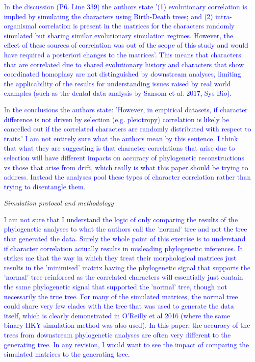\documentclass[12pt,letterpaper]{article}
\renewcommand{\subsection}[1]{%
\bigskip
\begin{center}
\begin{large}
\normalfont\itshape #1
\end{large}
\end{center}}
\begin{document}
\textcolor{blue}{In the discussion (P6. Line 339) the authors state '(1) evolutionary correlation is implied by simulating the characters using Birth-Death trees; and (2) intra-organismal correlation is present in the matrices for the characters randomly simulated but sharing similar evolutionary simulation regimes.  However, the effect of these sources of correlation was out of the scope of this study and would have required a posteriori changes to the matrices'. This means that characters that are correlated due to shared evolutionary history and characters that show coordinated homoplasy are not distinguished by downstream analyses, limiting the applicability of the results for understanding issues raised by real world examples (such as the dental data analysis by Sansom et al. 2017, Sys Bio).}

\textcolor{blue}{In the conclusions the authors state: 'However, in empirical datasets, if character difference is not driven by selection (e.g. pleiotropy) correlation is likely be cancelled out if the correlated characters are randomly distributed with respect to traits.' I am not entirely sure what the authors mean by this sentence. I think that what they are suggesting is that character correlations that arise due to selection will have different impacts on accuracy of phylogenetic reconstructions vs those that arise from drift, which really is what this paper should be trying to address. Instead the analyses pool these types of character correlation rather than trying to disentangle them.}

\subsection{Simulation protocol and methodology}

\textcolor{blue}{I am not sure that I understand the logic of only comparing the results of the phylogenetic analyses to what the authors call the 'normal' tree and not the tree that generated the data. Surely the whole point of this exercise is to understand if character correlation actually results in misleading phylogenetic inferences. It strikes me that the way in which they treat their morphological matrices just results in the 'minimised' matrix having the phylogenetic signal that supports the 'normal' tree reinforced as the correlated characters will essentially just contain the same phylogenetic signal that supported the 'normal' tree, though not necessarily the true tree.  For many of the simulated matrices, the normal tree could share very few clades with the tree that was used to generate the data itself, which is clearly demonstrated in O'Reilly et al 2016 (where the same binary HKY simulation method was also used). In this paper, the accuracy of the trees from downstream phylogenetic analyses are often very different to the generating tree. In any revision, I would want to see the impact of comparing the simulated matrices to the generating tree. }
\end{document}
